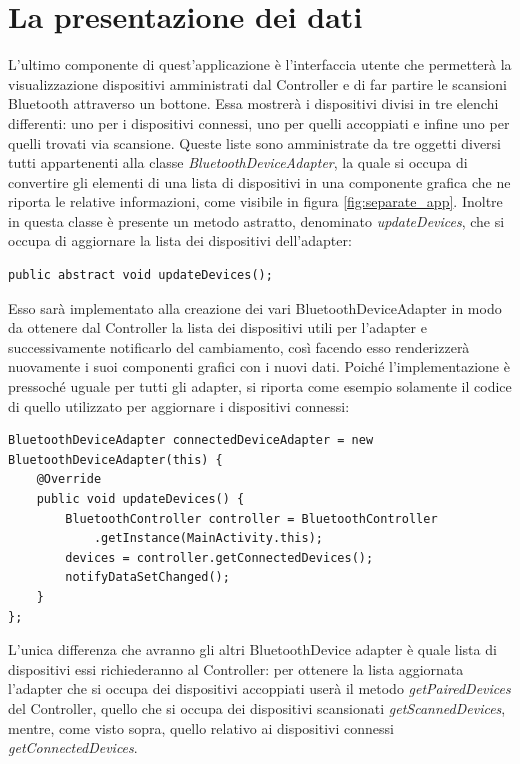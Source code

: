 \section{La presentazione dei dati}
L'ultimo componente di quest'applicazione è l'interfaccia utente che permetterà la visualizzazione dispositivi amministrati dal Controller e di far partire le scansioni Bluetooth attraverso un bottone. Essa mostrerà i dispositivi divisi in tre elenchi differenti: uno per i dispositivi connessi, uno per quelli accoppiati e infine uno per quelli trovati via scansione. Queste liste sono amministrate da tre oggetti diversi tutti appartenenti alla classe \textit{BluetoothDeviceAdapter}, la quale si occupa di convertire gli elementi di una lista di dispositivi in una componente grafica che ne riporta le relative informazioni, come visibile in figura \ref{fig:separate_app}.
Inoltre in questa classe è presente un metodo astratto, denominato \textit{updateDevices}, che si occupa di aggiornare la lista dei dispositivi dell'adapter:
\begin{verbatim}
public abstract void updateDevices();
\end{verbatim}
Esso sarà implementato alla creazione dei vari BluetoothDeviceAdapter in modo da ottenere dal Controller la lista dei dispositivi utili per l'adapter e successivamente notificarlo del cambiamento, così facendo esso renderizzerà nuovamente i suoi componenti grafici con i nuovi dati. Poiché l'implementazione è pressoché uguale per tutti gli adapter, si riporta come esempio solamente il codice di quello utilizzato per aggiornare i dispositivi connessi:
\begin{verbatim}
BluetoothDeviceAdapter connectedDeviceAdapter = new BluetoothDeviceAdapter(this) {
    @Override
    public void updateDevices() {
        BluetoothController controller = BluetoothController
            .getInstance(MainActivity.this);
        devices = controller.getConnectedDevices();
        notifyDataSetChanged();
    }
};
\end{verbatim}
L'unica differenza che avranno gli altri BluetoothDevice adapter è quale lista di dispositivi essi richiederanno al Controller: per ottenere la lista aggiornata l'adapter che si occupa dei dispositivi accoppiati userà il metodo \textit{getPairedDevices} del Controller, quello che si occupa dei dispositivi scansionati \textit{getScannedDevices}, mentre, come visto sopra, quello relativo ai dispositivi connessi \textit{getConnectedDevices}.

